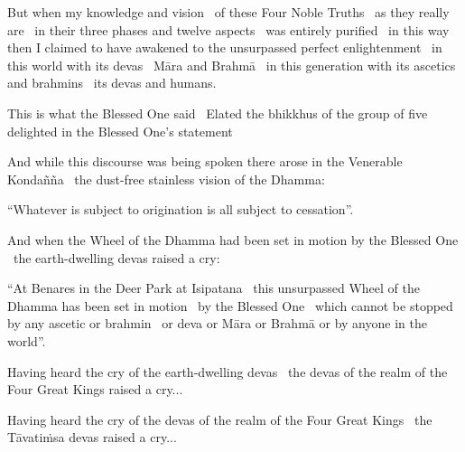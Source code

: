 \begin{english-only-hang}
  But when my knowledge and vision \breathmark\ of these Four Noble Truths \breathmark\ as they really are \breathmark\ in their three phases and twelve aspects \breathmark\ was entirely purified \breathmark\ in this way then I claimed to have awakened to the unsurpassed perfect enlightenment \breathmark\ in this world with its devas \breathmark\ Māra and Brahmā \breathmark\ in this generation with its ascetics and brahmins \breathmark\ its devas and humans.
\end{english-only-hang}

\begin{english-only-hang}
  This is what the Blessed One said \breathmark\ Elated the bhikkhus of the group of five delighted in the Blessed One's statement
\end{english-only-hang}

\begin{english-only-hang}
  And while this discourse was being spoken there arose in the Venerable Kondañña \breathmark\ the dust-free stainless vision of the Dhamma:
\end{english-only-hang}

\begin{english-only-hang}
  ``Whatever is subject to origination is all subject to cessation''.
\end{english-only-hang}

\begin{english-only-hang}
  And when the Wheel of the Dhamma had been set in motion by the Blessed One \breathmark\ the earth-dwelling devas raised a cry:
\end{english-only-hang}

\begin{english-only-hang}
  ``At Benares in the Deer Park at Isipatana \breathmark\ this unsurpassed Wheel of the Dhamma has been set in motion \breathmark\ by the Blessed One \breathmark\ which cannot be stopped by any ascetic or brahmin \breathmark\ or deva or Māra or Brahmā or by anyone in the world''.
\end{english-only-hang}

\begin{english-only-hang}
  Having heard the cry of the earth-dwelling devas \breathmark\ the devas of the realm of the Four Great Kings raised a cry...
\end{english-only-hang}

\begin{english-only-hang}
  Having heard the cry of the devas of the realm of the Four Great Kings \breathmark\ the Tāvatiṁsa devas raised a cry...
\end{english-only-hang}

